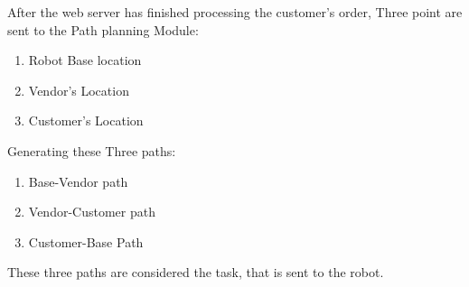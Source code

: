 After the web server has finished processing the customer's order, Three point are sent to the Path planning Module:
\begin{enumerate}
    \item Robot Base location
    \item Vendor's Location
    \item Customer's Location
\end{enumerate}
Generating these Three paths:
\begin{enumerate}
    \item Base-Vendor path
    \item Vendor-Customer path
    \item Customer-Base Path
\end{enumerate}
These three paths are considered the task, that is sent to the robot.


    
    
    





